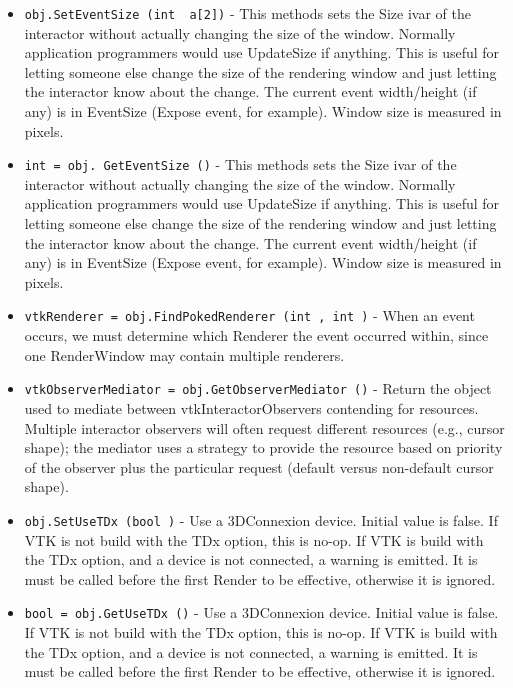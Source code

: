 \begin{itemize}
\item  \verb|obj.SetEventSize (int  a[2])| -  This methods sets the Size ivar of the interactor without
 actually changing the size of the window. Normally
 application programmers would use UpdateSize if anything.
 This is useful for letting someone else change the size of
 the rendering window and just letting the interactor
 know about the change.
 The current event width/height (if any) is in EventSize 
 (Expose event, for example).
 Window size is measured in pixels.

\item  \verb|int = obj. GetEventSize ()| -  This methods sets the Size ivar of the interactor without
 actually changing the size of the window. Normally
 application programmers would use UpdateSize if anything.
 This is useful for letting someone else change the size of
 the rendering window and just letting the interactor
 know about the change.
 The current event width/height (if any) is in EventSize 
 (Expose event, for example).
 Window size is measured in pixels.

\item  \verb|vtkRenderer = obj.FindPokedRenderer (int , int )| -  When an event occurs, we must determine which Renderer the event
 occurred within, since one RenderWindow may contain multiple
 renderers.

\item  \verb|vtkObserverMediator = obj.GetObserverMediator ()| -  Return the object used to mediate between vtkInteractorObservers
 contending for resources. Multiple interactor observers will often
 request different resources (e.g., cursor shape); the mediator uses a
 strategy to provide the resource based on priority of the observer plus
 the particular request (default versus non-default cursor shape).

\item  \verb|obj.SetUseTDx (bool )| -  Use a 3DConnexion device. Initial value is false.
 If VTK is not build with the TDx option, this is no-op.
 If VTK is build with the TDx option, and a device is not connected,
 a warning is emitted.
 It is must be called before the first Render to be effective, otherwise
 it is ignored.

\item  \verb|bool = obj.GetUseTDx ()| -  Use a 3DConnexion device. Initial value is false.
 If VTK is not build with the TDx option, this is no-op.
 If VTK is build with the TDx option, and a device is not connected,
 a warning is emitted.
 It is must be called before the first Render to be effective, otherwise
 it is ignored.

\end{itemize}
